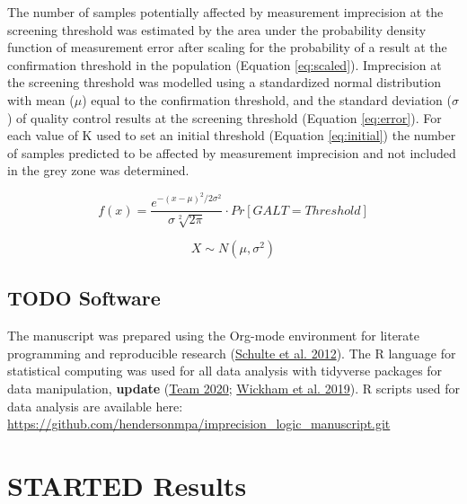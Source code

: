 \documentclass[review]{elsarticle}
\begin{document}
The number of samples potentially affected by measurement imprecision
at the screening threshold was estimated by the area under the
probability density function of measurement error after scaling for
the probability of a result at the confirmation threshold in the
population (Equation \ref{eq:scaled}). Imprecision at the screening
threshold was modelled using a standardized normal distribution with
mean (\(\mu\)) equal to the confirmation threshold, and the standard
deviation (\(\sigma\)) of quality control results at the screening
threshold (Equation \ref{eq:error}). For each value of K used to set
an initial threshold (Equation \ref{eq:initial}) the number of samples
predicted to be affected by measurement imprecision and not included
in the grey zone was determined.

\begin{equation}\label{eq:scaled}
f(x) = \frac{e^{-(x-\mu)^2/2\sigma^2}}{\sigma \sqrt[2]{2\pi}} \cdot Pr[GALT = Threshold] 
\end{equation}

\begin{equation}\label{eq:error}
X \sim N(\mu, \sigma^2)
\end{equation}

\subsection*{{\bfseries\sffamily TODO} Software}
\label{sec:orga4cf3fb}
The manuscript was prepared using the Org-mode environment for
literate programming and reproducible research (\hyperlink{citeproc_bib_item_1}{Schulte et al. 2012}). The R language for statistical computing was used
for all data analysis with tidyverse packages for data manipulation,
\textbf{update} (\hyperlink{citeproc_bib_item_2}{Team 2020}; \hyperlink{citeproc_bib_item_3}{Wickham et al. 2019}). R scripts used for data
analysis are available here:
\url{https://github.com/hendersonmpa/imprecision\_logic\_manuscript.git}

\section*{{\bfseries\sffamily STARTED} Results}
\label{sec:orgbec5c8d}
\end{document}
